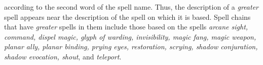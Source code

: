 

according to the second word of the spell name. Thus, the description of a \textit{greater
}spell appears near the description of the spell on which it is based. Spell chains
that have \textit{greater} spells in them include those based on the spells \textit{arcane
sight, command, dispel magic, glyph of warding, invisibility, magic fang, magic
weapon, planar ally, planar binding, prying eyes, restoration, scrying, shadow
conjuration, shadow evocation, shout}, and \textit{teleport}.
